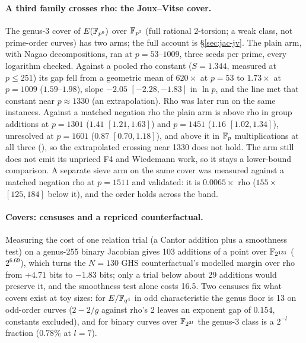 \paragraph{A third family crosses rho: the Joux--Vitse cover.} The
genus-3 cover of $E(\mathbb{F}_{p^6})$ over $\mathbb{F}_{p^2}$ (full rational 2-torsion;
a weak class, not prime-order curves) has two arms; the full account is
\S\ref{sec:jac-jv}. The plain arm, with Nagao decompositions, ran at
$p=53$--$1009$, three seeds per prime, every logarithm checked. Against a
pooled rho constant ($S=1.344$, measured at $p\le251$) its gap fell from a
geometric mean of $620\times$ at $p=53$ to $1.73\times$ at $p=1009$
($1.59$--$1.98$), slope $-2.05$ $[-2.28,-1.83]$ in $\ln p$, and the line met
that constant near $p\approx1330$ (an extrapolation). Rho was later run on
the same instances. Against a matched negation rho the plain arm is above
rho in group additions at $p=1301$ ($1.41$ $[1.21,1.63]$) and $p=1451$
($1.16$ $[1.02,1.34]$), unresolved at $p=1601$ ($0.87$ $[0.70,1.18]$), and
above it in $\mathbb{F}_p$ multiplications at all three
(), so the
extrapolated crossing near 1330 does not hold. The arm still does not emit
its unpriced F4 and Wiedemann work, so it stays a lower-bound comparison. A
separate sieve arm on the same cover was measured against a matched
negation rho at $p=1511$ and validated: it is $0.0065\times$ rho
($155\times$ $[125,184]$ below it), and the order holds across the band.

\paragraph{Covers: censuses and a repriced counterfactual.} Measuring the
cost of one relation trial (a Cantor addition plus a smoothness test) on a
genus-255 binary Jacobian gives 103 additions of a point over $\mathbb{F}_{2^{131}}$
($2^{6.69}$), which turns the $N=130$ GHS counterfactual's modelled margin
over rho from $+4.71$ bits to $-1.83$ bits; only a trial below about 29
additions would preserve it, and the smoothness test alone costs 16.5. Two
censuses fix what covers exist at toy sizes: for $E/\mathbb{F}_{q^4}$ in odd
characteristic the genus floor is 13 on odd-order curves ($2-2/g$ against
rho's 2 leaves an exponent gap of $0.154$, constants excluded), and for
binary curves over $\mathbb{F}_{2^{3l}}$ the genus-3 class is a $2^{-l}$ fraction
($0.78\%$ at $l=7$).

